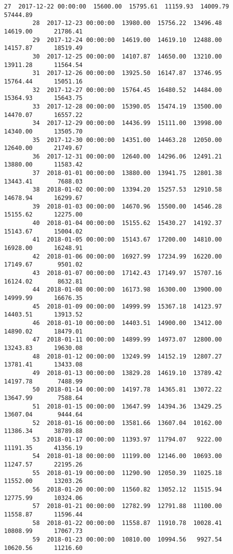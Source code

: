 \documentclass[11pt]{article}
\begin{document}
\begin{Verbatim}[commandchars=\\\{\}]
        27  2017-12-22 00:00:00  15600.00  15795.61  11159.93  14009.79      57444.89   
        28  2017-12-23 00:00:00  13980.00  15756.22  13496.48  14619.00      21786.41   
        29  2017-12-24 00:00:00  14619.00  14619.10  12488.00  14157.87      18519.49   
        30  2017-12-25 00:00:00  14107.87  14650.00  13210.00  13911.28      11564.54   
        31  2017-12-26 00:00:00  13925.50  16147.87  13746.95  15764.44      15051.16   
        32  2017-12-27 00:00:00  15764.45  16480.52  14484.00  15364.93      15643.75   
        33  2017-12-28 00:00:00  15390.05  15474.19  13500.00  14470.07      16557.22   
        34  2017-12-29 00:00:00  14436.99  15111.00  13998.00  14340.00      13505.70   
        35  2017-12-30 00:00:00  14351.00  14463.28  12050.00  12640.00      21749.67   
        36  2017-12-31 00:00:00  12640.00  14296.06  12491.21  13880.00      11583.42   
        37  2018-01-01 00:00:00  13880.00  13941.75  12801.38  13443.41       7688.03   
        38  2018-01-02 00:00:00  13394.20  15257.53  12910.58  14678.94      16299.67   
        39  2018-01-03 00:00:00  14670.96  15500.00  14546.28  15155.62      12275.00   
        40  2018-01-04 00:00:00  15155.62  15430.27  14192.37  15143.67      15004.02   
        41  2018-01-05 00:00:00  15143.67  17200.00  14810.00  16928.00      16248.91   
        42  2018-01-06 00:00:00  16927.99  17234.99  16220.00  17149.67       9501.02   
        43  2018-01-07 00:00:00  17142.43  17149.97  15707.16  16124.02       8632.81   
        44  2018-01-08 00:00:00  16173.98  16300.00  13900.00  14999.99      16676.35   
        45  2018-01-09 00:00:00  14999.99  15367.18  14123.97  14403.51      13913.52   
        46  2018-01-10 00:00:00  14403.51  14900.00  13412.00  14890.02      18479.01   
        47  2018-01-11 00:00:00  14899.99  14973.07  12800.00  13243.83      19630.08   
        48  2018-01-12 00:00:00  13249.99  14152.19  12807.27  13781.41      13433.08   
        49  2018-01-13 00:00:00  13829.28  14619.10  13789.42  14197.78       7488.99   
        50  2018-01-14 00:00:00  14197.78  14365.81  13072.22  13647.99       7588.64   
        51  2018-01-15 00:00:00  13647.99  14394.36  13429.25  13607.04       9444.64   
        52  2018-01-16 00:00:00  13581.66  13607.04  10162.00  11386.34      38789.88   
        53  2018-01-17 00:00:00  11393.97  11794.07   9222.00  11191.35      41356.19   
        54  2018-01-18 00:00:00  11199.00  12146.00  10693.00  11247.57      22195.26   
        55  2018-01-19 00:00:00  11290.90  12050.39  11025.18  11552.00      13203.26   
        56  2018-01-20 00:00:00  11560.82  13052.12  11515.94  12775.99      10324.06   
        57  2018-01-21 00:00:00  12782.99  12791.88  11100.00  11558.87      11596.44   
        58  2018-01-22 00:00:00  11558.87  11910.78  10028.41  10808.99      17067.73   
        59  2018-01-23 00:00:00  10810.00  10994.56   9927.54  10620.56      11216.60   
        

\end{Verbatim}
\end{document}
